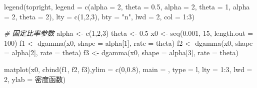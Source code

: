 \documentclass[
]{book}
\newenvironment{Shaded}{\begin{snugshade}}{\end{snugshade}}
\newcommand{\AttributeTok}[1]{\textcolor[rgb]{0.77,0.63,0.00}{#1}}
\newcommand{\CommentTok}[1]{\textcolor[rgb]{0.56,0.35,0.01}{\textit{#1}}}
\newcommand{\DecValTok}[1]{\textcolor[rgb]{0.00,0.00,0.81}{#1}}
\newcommand{\FloatTok}[1]{\textcolor[rgb]{0.00,0.00,0.81}{#1}}
\newcommand{\FunctionTok}[1]{\textcolor[rgb]{0.00,0.00,0.00}{#1}}
\newcommand{\NormalTok}[1]{#1}
\newcommand{\OtherTok}[1]{\textcolor[rgb]{0.56,0.35,0.01}{#1}}
\newcommand{\SpecialCharTok}[1]{\textcolor[rgb]{0.00,0.00,0.00}{#1}}
\newcommand{\StringTok}[1]{\textcolor[rgb]{0.31,0.60,0.02}{#1}}
\begin{document}
\begin{Shaded}
\begin{Highlighting}[]
\FunctionTok{legend}\NormalTok{(}\StringTok{\textquotesingle{}topright\textquotesingle{}}\NormalTok{, }\AttributeTok{legend =} \FunctionTok{c}\NormalTok{(}\StringTok{\textquotesingle{}alpha = 2, theta = 0.5\textquotesingle{}}\NormalTok{, }
                              \StringTok{\textquotesingle{}alpha = 2, theta = 1\textquotesingle{}}\NormalTok{, }
                              \StringTok{\textquotesingle{}alpha = 2, theta = 2\textquotesingle{}}\NormalTok{),}
       \AttributeTok{lty =} \FunctionTok{c}\NormalTok{(}\DecValTok{1}\NormalTok{,}\DecValTok{2}\NormalTok{,}\DecValTok{3}\NormalTok{), }\AttributeTok{bty =} \StringTok{"n"}\NormalTok{, }\AttributeTok{lwd =} \DecValTok{2}\NormalTok{,  }\AttributeTok{col =} \DecValTok{1}\SpecialCharTok{:}\DecValTok{3}\NormalTok{)}

\CommentTok{\# 固定比率参数}
\NormalTok{alpha }\OtherTok{\textless{}{-}} \FunctionTok{c}\NormalTok{(}\DecValTok{1}\NormalTok{,}\DecValTok{2}\NormalTok{,}\DecValTok{3}\NormalTok{)}
\NormalTok{theta }\OtherTok{\textless{}{-}} \FloatTok{0.5}
\NormalTok{x0 }\OtherTok{\textless{}{-}} \FunctionTok{seq}\NormalTok{(}\FloatTok{0.001}\NormalTok{, }\DecValTok{15}\NormalTok{, }\AttributeTok{length.out =} \DecValTok{100}\NormalTok{)}
\NormalTok{f1 }\OtherTok{\textless{}{-}} \FunctionTok{dgamma}\NormalTok{(x0,  }\AttributeTok{shape =}\NormalTok{ alpha[}\DecValTok{1}\NormalTok{], }\AttributeTok{rate =}\NormalTok{ theta)}
\NormalTok{f2 }\OtherTok{\textless{}{-}} \FunctionTok{dgamma}\NormalTok{(x0,  }\AttributeTok{shape =}\NormalTok{ alpha[}\DecValTok{2}\NormalTok{], }\AttributeTok{rate =}\NormalTok{ theta)}
\NormalTok{f3 }\OtherTok{\textless{}{-}} \FunctionTok{dgamma}\NormalTok{(x0,  }\AttributeTok{shape =}\NormalTok{ alpha[}\DecValTok{3}\NormalTok{], }\AttributeTok{rate =}\NormalTok{ theta)}

\FunctionTok{matplot}\NormalTok{(x0, }\FunctionTok{cbind}\NormalTok{(f1, f2, f3),}\AttributeTok{ylim =} \FunctionTok{c}\NormalTok{(}\DecValTok{0}\NormalTok{,}\FloatTok{0.8}\NormalTok{), }\AttributeTok{main =} \StringTok{\textquotesingle{}\textquotesingle{}}\NormalTok{,  }\AttributeTok{type =} \StringTok{\textquotesingle{}l\textquotesingle{}}\NormalTok{, }\AttributeTok{lty =} \DecValTok{1}\SpecialCharTok{:}\DecValTok{3}\NormalTok{, }\AttributeTok{lwd =} \DecValTok{2}\NormalTok{, }\AttributeTok{ylab =} \StringTok{\textquotesingle{}密度函数\textquotesingle{}}\NormalTok{)}
\end{Highlighting}
\end{Shaded}
\end{document}
